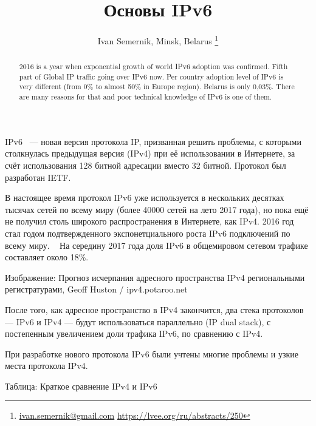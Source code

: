 \documentclass[10pt, a5paper]{article}
\begin{document}
\title{Основы IPv6}
\author{Ivan Semernik, Minsk, Belarus \footnote{\url{ivan.semernik@gmail.com} \url {https://lvee.org/ru/abstracts/250}}}
\maketitle
\begin{abstract}
2016 is a year when exponential growth of world IPv6 adoption was confirmed. Fifth part of Global IP traffic going over IPv6 now. Per country adoption level of IPv6 is very different (from 0\% to almost 50\% in Europe region). Belarus is only 0,03\%. There are many reasons for that and poor technical knowledge of IPv6 is one of them.
\end{abstract}
IPv6 ~--- новая версия протокола IP, призванная решить проблемы, с которыми столкнулась предыдущая версия (IPv4) при её использовании в Интернете, за счёт использования 128 битной адресации вместо 32 битной. Протокол был разработан IETF. ~\cite{Semernik-0}

В настоящее время протокол IPv6 уже используется в нескольких десятках тысячах сетей по всему миру (более 40000 сетей на лето 2017 года), но пока ещё не получил столь широкого распространения в Интернете, как IPv4. 2016 год стал годом подтвержденного экспонетциального роста IPv6 подключений по всему миру. ~\cite{Semernik-1} На середину 2017 года доля IPv6 в общемировом сетевом трафике составляет около 18\%. ~\cite{Semernik-2}

Изображение: Прогноз исчерпания адресного пространства IPv4 региональными регистратурами, Geoff Huston / ipv4.potaroo.net



После того, как адресное пространство в IPv4 закончится, два стека протоколов — IPv6 и IPv4 — будут использоваться параллельно (IP dual stack), с постепенным увеличением доли трафика IPv6, по сравнению с IPv4.

При разработке нового протокола IPv6 были учтены многие проблемы и узкие места протокола IPv4.

Таблица: Краткое сравнение IPv4 и IPv6
\end{document}

